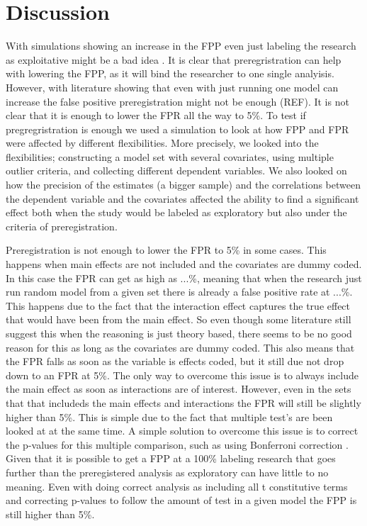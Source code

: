\section{Discussion}
With simulations showing an increase in the FPP even just labeling the research as exploitative might be a bad idea \citep{Simmons2011}. It is clear that preregristration can help with lowering the FPP, as it will bind the researcher to one single analyisis. However, with literature showing that even with just running one model can increase the false positive preregistration might not be enough (REF). It is not clear that it is enough to lower the FPR all the way to 5\%. To test if pregregristration is enough we used a simulation to look at how FPP and FPR were affected by different flexibilities. More precisely, we looked into the flexibilities; constructing a model set with several covariates, using multiple outlier criteria, and collecting different dependent variables. We also looked on how the precision of the estimates (a bigger sample) and the correlations between the dependent variable and the covariates affected the ability to find a significant effect both when the study would be labeled as exploratory but also under the criteria of preregistration. 

Preregistration is not enough to lower the FPR to 5\%  in some cases. This happens when main effects are not included and the covariates are dummy coded. In this case the FPR can get as high as ...\%, meaning that when the research just run random model from a given set there is already a false positive rate at ...\%. This happens due to the fact that the interaction effect captures the true effect that would have been from the main effect. So even though some literature still suggest this when the reasoning is just theory based, there seems to be no good reason for this as long as the covariates are dummy coded. This also means that the FPR falls as soon as the variable is effects coded, but it still due not drop down to an FPR at 5\%. The only way to overcome this issue is to always include the main effect as soon as interactions are of interest. However, even in the sets that that includeds the main effects and interactions the FPR will still be slightly higher than 5\%. This is simple due to the fact that multiple test's are been looked at at the same time. A simple solution to overcome this issue is to correct the p-values for this multiple comparison, such as using Bonferroni correction \citep{dunn1961multiple}.
Given that it is possible to get a FPP at a 100\% labeling research that goes further than the preregistered analysis as exploratory can have little to no meaning. Even with doing correct analysis as including all t constitutive terms and correcting p-values to follow the amount of test in a given model the FPP is still higher than 5\%. 
    
